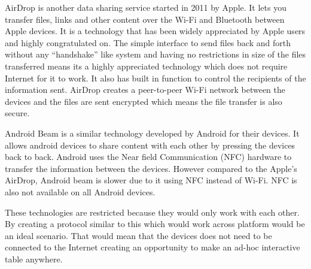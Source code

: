 AirDrop\cite{airdrop} is another data sharing service started in
2011 by Apple. It lets you transfer files, links and other content
over the Wi-Fi and Bluetooth between Apple devices. It is a technology
that has been widely appreciated by Apple users and highly congratulated
on. The simple interface to send files back and forth without any
``handshake'' like system and having no restrictions in size of
the files transferred means its a highly appreciated technology which
does not require Internet for it to work. It also has built in function
to control the recipients of the information sent. AirDrop creates
a peer-to-peer Wi-Fi network between the devices and the files are
sent encrypted which means the file transfer is also secure.

Android Beam\cite{android-beam} is a similar technology developed
by Android for their devices. It allows android devices to share content
with each other by pressing the devices back to back. Android uses
the Near field Communication (NFC) hardware to transfer the information
between the devices. However compared to the Apple's AirDrop, Android
beam is slower due to it using NFC instead of Wi-Fi. NFC is also not
available on all Android devices.

These technologies are restricted because they would only work with
each other. By creating a protocol similar to this which would work
across platform would be an ideal scenario. That would mean that the
devices does not need to be connected to the Internet creating an
opportunity to make an ad-hoc interactive table anywhere.

